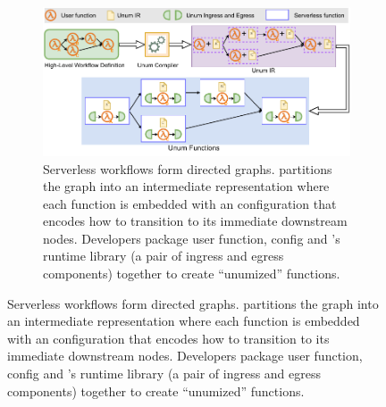 \begin{figure}[t!]
	\centering
	\begin{subfigure}[t]{0.8\textwidth}
	\centering
		\includegraphics[width=0.8\columnwidth]{figures/unum-arch-compile-time.pdf}
		\caption{Serverless workflows form directed graphs. \name{}
		partitions the graph into an intermediate representation where each
		function is embedded with an \name{} configuration that encodes how to
		transition to its immediate downstream nodes. Developers package user
		function, \name{} config and \name{}'s runtime library (a pair of
		ingress and egress components) together to create ``unumized'' functions.}
		\label{fig:arch:unum-compile-time}


\end{subfigure}
\end{figure}
